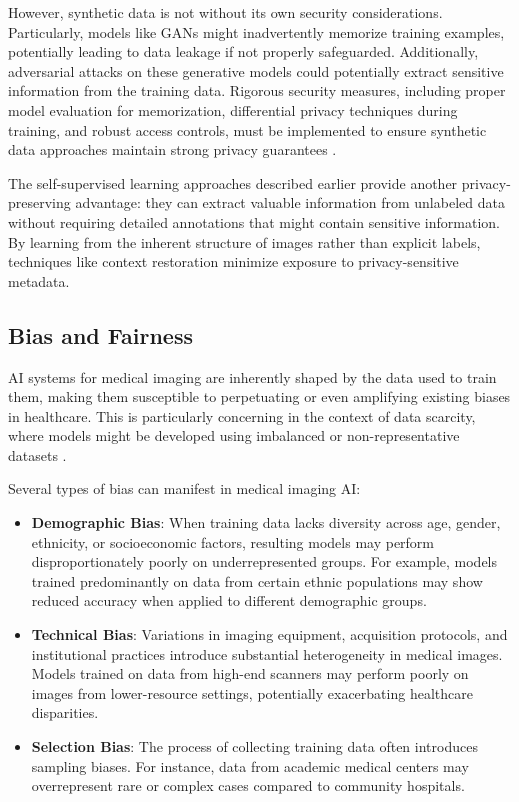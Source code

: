 \documentclass{article}
\begin{document}
However, synthetic data is not without its own security considerations. Particularly, models like GANs might inadvertently memorize training examples, potentially leading to data leakage if not properly safeguarded. Additionally, adversarial attacks on these generative models could potentially extract sensitive information from the training data. Rigorous security measures, including proper model evaluation for memorization, differential privacy techniques during training, and robust access controls, must be implemented to ensure synthetic data approaches maintain strong privacy guarantees \cite{koetzierGeneratingSyntheticData2024}.

The self-supervised learning approaches described earlier provide another privacy-preserving advantage: they can extract valuable information from unlabeled data without requiring detailed annotations that might contain sensitive information. By learning from the inherent structure of images rather than explicit labels, techniques like context restoration minimize exposure to privacy-sensitive metadata.

\subsection{Bias and Fairness}
AI systems for medical imaging are inherently shaped by the data used to train them, making them susceptible to perpetuating or even amplifying existing biases in healthcare. This is particularly concerning in the context of data scarcity, where models might be developed using imbalanced or non-representative datasets \cite{koetzierGeneratingSyntheticData2024}.

Several types of bias can manifest in medical imaging AI:

\begin{itemize}
    \item \textbf{Demographic Bias}: When training data lacks diversity across age, gender, ethnicity, or socioeconomic factors, resulting models may perform disproportionately poorly on underrepresented groups. For example, models trained predominantly on data from certain ethnic populations may show reduced accuracy when applied to different demographic groups.
    
    \item \textbf{Technical Bias}: Variations in imaging equipment, acquisition protocols, and institutional practices introduce substantial heterogeneity in medical images. Models trained on data from high-end scanners may perform poorly on images from lower-resource settings, potentially exacerbating healthcare disparities.
    
    \item \textbf{Selection Bias}: The process of collecting training data often introduces sampling biases. For instance, data from academic medical centers may overrepresent rare or complex cases compared to community hospitals.
\end{itemize}
\end{document}
